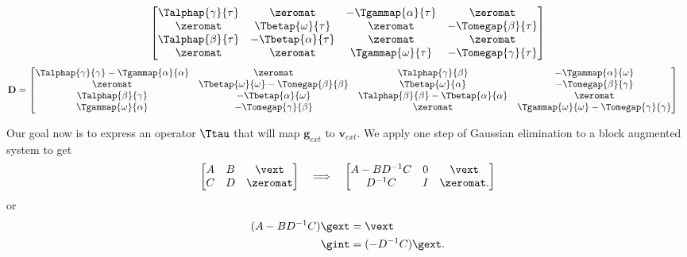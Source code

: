 {\begin{align}
\begin{bmatrix}
        \Talphap{\gamma}{\tau} & \zeromat & -\Tgammap{\alpha}{\tau} & \zeromat \\
        \zeromat & \Tbetap{\omega}{\tau} & \zeromat & -\Tomegap{\beta}{\tau} \\
        \Talphap{\beta}{\tau} & -\Tbetap{\alpha}{\tau} & \zeromat & \zeromat \\
        \zeromat & \zeromat & \Tgammap{\omega}{\tau} & -\Tomegap{\gamma}{\tau}
    \end{bmatrix}
    \label{eq:matrix_C}
\end{align}
\begin{align}
    \mathbf{D} &=
    \begin{bmatrix}
        \Talphap{\gamma}{\gamma} - \Tgammap{\alpha}{\alpha} & \zeromat 
             & \Talphap{\gamma}{\beta} & -\Tgammap{\alpha}{\omega} \\
        \zeromat & \Tbetap{\omega}{\omega} - \Tomegap{\beta}{\beta} & 
            \Tbetap{\omega}{\alpha} & -\Tomegap{\beta}{\gamma} \\
        \Talphap{\beta}{\gamma} & -\Tbetap{\alpha}{\omega} & \Talphap{\beta}{\beta} -  
            \Tbetap{\alpha}{\alpha} &\zeromat \\
        \Tgammap{\omega}{\alpha} & -\Tomegap{\gamma}{\beta} & 
            \zeromat &\Tgammap{\omega}{\omega} - \Tomegap{\gamma}{\gamma} \\
    \end{bmatrix}
    \label{eq:matrix_D}
\end{align}
} %
Our goal now is to express an operator $\Ttau$ that will map $\mathbf g_{ext}$ to $\mathbf v_{ext}$.  We apply one step of Gaussian elimination to a block augmented system to get
\begin{equation}
\begin{bmatrix}
A & B & \vext\\
C & D & \zeromat\\
\end{bmatrix} 
\quad
\Longrightarrow 
\quad
\begin{bmatrix}
A - BD^{-1}C & 0 & \vext\\
D^{-1}C      & I & \zeromat.
\end{bmatrix}
\end{equation}
or
\begin{equation}
\begin{aligned}
(A - BD^{-1}C) \gext & = \vext \\
\gint & = (-D^{-1} C) \gext.
\end{aligned}
\end{equation}
